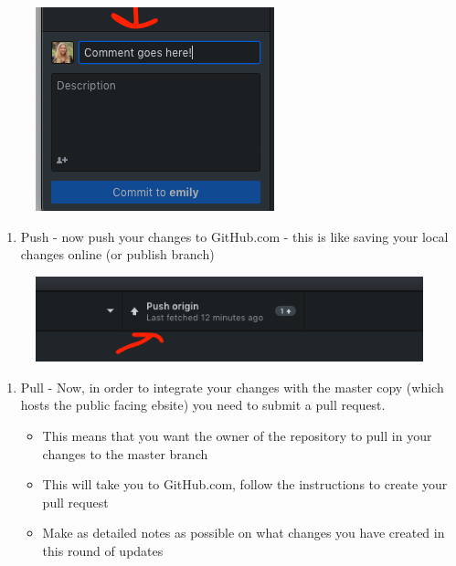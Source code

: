 \documentclass[]{book}
\providecommand{\tightlist}{%
  \setlength{\itemsep}{0pt}\setlength{\parskip}{0pt}}
\begin{document}
\begin{figure}
\centering
\includegraphics{images/research_protocols/github/25.png}
\caption{}
\end{figure}

\begin{enumerate}
\def\labelenumi{\arabic{enumi}.}
\setcounter{enumi}{5}
\tightlist
\item
  Push - now push your changes to GitHub.com - this is like saving your local changes online (or publish branch)
\end{enumerate}

\begin{figure}
\centering
\includegraphics{images/research_protocols/github/26.png}
\caption{}
\end{figure}

\begin{enumerate}
\def\labelenumi{\arabic{enumi}.}
\setcounter{enumi}{6}
\tightlist
\item
  Pull - Now, in order to integrate your changes with the master copy (which hosts the public facing ebsite) you need to submit a pull request.

  \begin{itemize}
  \tightlist
  \item
    This means that you want the owner of the repository to pull in your changes to the master branch
  \item
    This will take you to GitHub.com, follow the instructions to create your pull request
  \item
    Make as detailed notes as possible on what changes you have created in this round of updates
  \end{itemize}
\end{enumerate}
\end{document}
